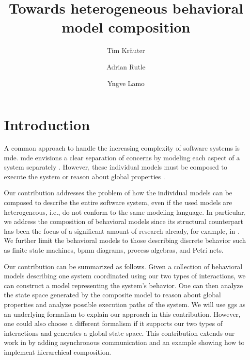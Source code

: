 \documentclass[a4paper]{easychair}
\title{Towards heterogeneous behavioral model composition}
\author{
Tim Kräuter
\and
Adrian Rutle
\and
Yngve Lamo
}
\institute{
  Høgskulen på Vestlandet\\
  Bergen, Norway\\
  \email{tkra@hvl.no, aru@hvl.no, yla@hvl.no}
 }
\begin{document}
\maketitle

\section{Introduction}
A common approach to handle the increasing complexity of software systems is \gls*{mde}.
\gls*{mde} envisions a clear separation of concerns by modeling each aspect of a system separately \cite{franceModeldrivenDevelopmentComplex2007}.
However, these individual models must be composed to execute the system or reason about global properties \cite{kienzleUnifyingFrameworkHomogeneous2019}.

Our contribution addresses the problem of how the individual models can be composed to describe the entire software system, even if the used models are heterogeneous, i.e., do not conform to the same modeling language.
In particular, we address the composition of behavioral models since its structural counterpart has been the focus of a significant amount of research already, for example, in \cite{kienzleUnifyingFrameworkHomogeneous2019, klareCommonalitiesPreservingConsistency2019, stunkelComprehensiveSystemsFormal2021}.
We further limit the behavioral models to those describing discrete behavior such as finite state machines, \gls*{bpmn} diagrams, process algebras, and Petri nets. %

Our contribution can be summarized as follows.
Given a collection of behavioral models describing one system coordinated using our two types of interactions, we can construct a model representing the system's behavior.
One can then analyze the state space generated by the composite model to reason about global properties and analyze possible execution paths of the system.
We will use \glspl*{gg} as an underlying formalism to explain our approach in this contribution.
However, one could also choose a different formalism if it supports our two types of interactions and generates a global state space.
This contribution extends our work in \cite{krauterBehavioralConsistencyHeterogeneous2021} by adding asynchronous communication and an example showing how to implement hierarchical composition.
\end{document}
